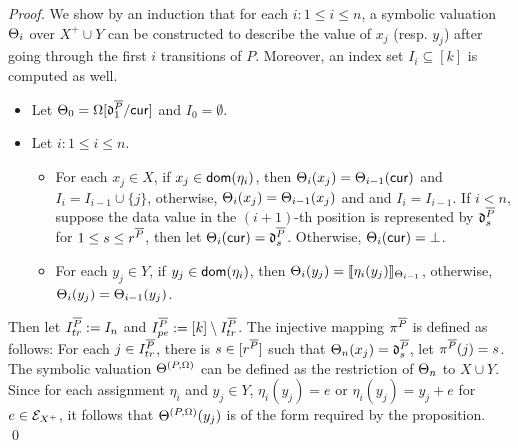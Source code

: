 \begin{appendix}
\begin{proof}
We show by an induction that for each $i: 1 \le i \le n$, a symbolic valuation $\Theta_i$ over $X^+ \cup Y$ can be constructed  to describe the value of $x_j$ (resp. $y_j$) after going through the first $i$ transitions of $P$. Moreover, an index set $I_i \subseteq [k]$ is computed as well.
%
\begin{itemize}
\item Let $\Theta_0=\Omega[\mathfrak{d}^{\overline{P}}_1/\mathsf{cur}]$ and $I_0 = \emptyset$.
%
%
\item Let $i: 1 \le i \le n$. 
\begin{itemize}
\item For each $x_j \in X$, if $x_j \in \mathsf{dom}(\eta_i)$, then $\Theta_i(x_j)=\Theta_{i-1}(\mathsf{cur})$ and $I_i= I_{i-1} \cup \{j\}$, otherwise, $\Theta_i(x_j) = \Theta_{i-1}(x_j)$ and and $I_i= I_{i-1}$. If $i < n$, suppose  the data value in the $(i+1)$-th position is represented by $\mathfrak{d}^{\overline{P}}_s$ for $1 \le s \le r^{\overline{P}}$, then let $\Theta_i(\mathsf{cur})=\mathfrak{d}^{\overline{P}}_s$. Otherwise, $\Theta_i(\mathsf{cur})=\bot$.
%
\item For each $y_j \in Y$, if $y_j \in \mathsf{dom}(\eta_i)$, then $\Theta_i(y_j) = \llbracket\eta_i(y_j)\rrbracket_{\Theta_{i-1}}$, otherwise, $\Theta_i(y_j) =\Theta_{i-1}(y_j)$.
%
\end{itemize} 
\end{itemize}
Then let $I^{\overline{P}}_{tr}:=I_n$ and $I^{\overline{P}}_{pe}:=[k] \setminus I^{\overline{P}}_{tr}$. The injective mapping $\pi^{\overline{P}}$ is defined as follows: For each $j \in I^{\overline{P}}_{tr}$, there is $s \in [r^{\overline{P}}]$ such that $\Theta_n(x_j)=\mathfrak{d}^{\overline{P}}_{s}$, let $\pi^{\overline{P}}(j)=s$. The symbolic valuation $\Theta^{(P,\Omega)}$ can be defined as the restriction of $\Theta_n$ to $X \cup Y$. Since for each assignment $\eta_i$ and $y_j \in Y$, $\eta_i(y_j) = e$ or $\eta_i(y_j) = y_j +e$ for $e \in {\mathcal{E} }_{X^+}$, it follows that $\Theta^{(P,\Omega)}(y_j)$ is of the form required by the proposition.
\qed
\end{proof}



\end{appendix}
